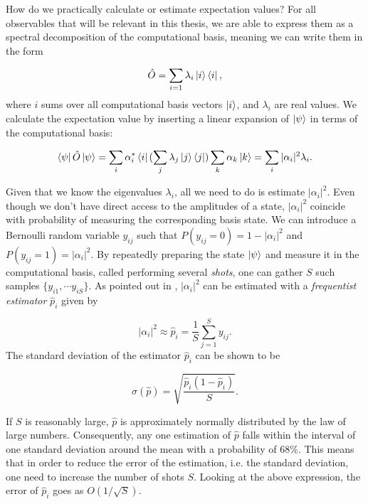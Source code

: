 How do we practically calculate or estimate expectation values? For all observables that will be relevant in this thesis, we are able to express them as a spectral decomposition of the computational basis, meaning we can write them in the form 

\begin{equation}\label{eq:ExpectedValue}
    \hat{O} = \sum_{i=1} \lambda_i\ket{i}\bra{i},
\end{equation}
where $i$ sums over all computational basis vectors $\ket{i}$, and $\lambda_i$ are real values. We calculate the expectation value by inserting a linear expansion of $\ket{\psi}$ in terms of the computational basis:

\begin{equation}\label{eq:ExpectedValueExact}
    \bra{\psi}\hat{O}\ket{\psi} = \sum_{i} \alpha_i^*\bra{i}(\sum_{j} \lambda_j\ket{j}\bra{j})\sum_{k} \alpha_k\ket{k} = \sum_{i} |\alpha_i|^2\lambda_i.
\end{equation}

Given that we know the eigenvalues $\lambda_i$, all we need to do is estimate $|\alpha_i|^2$. Even though we don't have direct access to the amplitudes of a state, $|\alpha_i|^2$ coincide with probability of measuring the corresponding basis state. We can introduce a Bernoulli random variable $y_{ij}$ such that $P(y_{ij} = 0) = 1-|\alpha_i|^2$ and $P(y_{ij} = 1) = |\alpha_i|^2$. By repeatedly preparing the state $\ket{\psi}$ and measure it in the computational basis, called performing several \emph{shots}, one can gather $S$ such samples $\{y_{i1}, \cdots y_{iS}\}$. As pointed out in \citet{SupervisedwquantumComputers}, $|\alpha_i|^2$ can be estimated with a \emph{frequentist estimator} $\hat{p}_i$ given by

\begin{equation}
    |\alpha_i|^2 \approx \hat{p}_i = \frac{1}{S}\sum_{j=1}^S y_{ij}.
\end{equation}
The standard deviation of the estimator $\hat{p}_i$ can be shown to be

\begin{equation}
    \sigma(\hat{p}) = \sqrt{\frac{\hat{p}_i(1-\hat{p}_i)}{S}}.
\end{equation}


If $S$ is reasonably large, $\hat{p}$ is approximately normally distributed by the law of large numbers. Consequently, any one estimation of $\hat{p}$ falls within the interval of one standard deviation around the mean with a probability of $68\%$. This means that in order to reduce the error of the estimation, i.e. the standard deviation, one need to increase the number of shots $S$. Looking at the above expression, the error of $\hat{p}_i$ goes as $O(1/\sqrt{S})$. 

